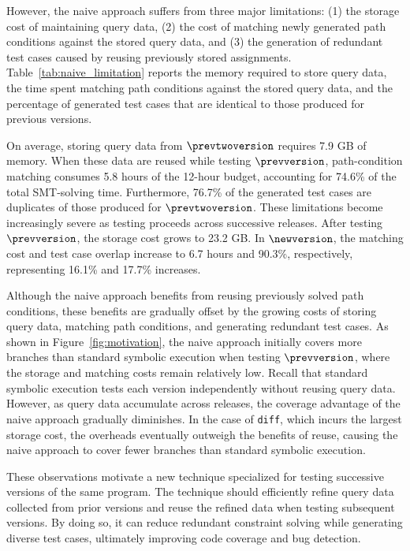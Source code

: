 However, the naive approach suffers from three major limitations: (1) the storage cost of maintaining query data, (2) the cost of matching newly generated path conditions against the stored query data, and (3) the generation of redundant test cases caused by reusing previously stored assignments. Table~\ref{tab:naive_limitation} reports the memory required to store query data, the time spent matching path conditions against the stored query data, and the percentage of generated test cases that are identical to those produced for previous versions.

On average, storing query data from $\prevtwoversion$ requires 7.9 GB of memory. When these data are reused while testing $\prevversion$, path-condition matching consumes 5.8 hours of the 12-hour budget, accounting for 74.6\% of the total SMT-solving time. Furthermore, 76.7\% of the generated test cases are duplicates of those produced for $\prevtwoversion$. These limitations become increasingly severe as testing proceeds across successive releases. After testing $\prevversion$, the storage cost grows to 23.2 GB. In $\newversion$, the matching cost and test case overlap increase to 6.7 hours and 90.3\%, respectively, representing 16.1\% and 17.7\% increases.

Although the naive approach benefits from reusing previously solved path conditions, these benefits are gradually offset by the growing costs of storing query data, matching path conditions, and generating redundant test cases. As shown in Figure~\ref{fig:motivation}, the naive approach initially covers more branches than standard symbolic execution when testing $\prevversion$, where the storage and matching costs remain relatively low. Recall that standard symbolic execution tests each version independently without reusing query data. However, as query data accumulate across releases, the coverage advantage of the naive approach gradually diminishes. In the case of \texttt{diff}, which incurs the largest storage cost, the overheads eventually outweigh the benefits of reuse, causing the naive approach to cover fewer branches than standard symbolic execution.

These observations motivate a new technique specialized for testing successive versions of the same program. The technique should efficiently refine query data collected from prior versions and reuse the refined data when testing subsequent versions. By doing so, it can reduce redundant constraint solving while generating diverse test cases, ultimately improving code coverage and bug detection.